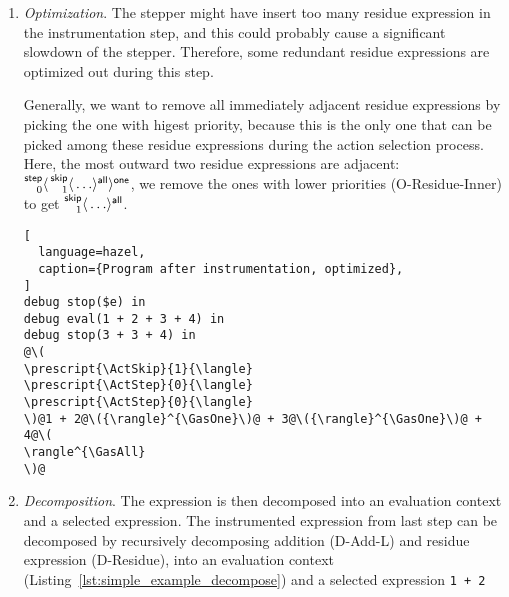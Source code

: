 \begin{enumerate}
  \begin{lstlisting}[language=hazel,caption={Program after instrumentation},label={lst:simple_example_instrument}]
debug stop($e) in
debug eval(1 + 2 + 3 + 4) in
debug stop(3 + 3 + 4) in
@\(
\prescript{\ActStep}{0}{\langle}
\prescript{\ActSkip}{1}{\langle}
\prescript{\ActStep}{0}{\langle}
\prescript{\ActStep}{0}{\langle}
\)@1 + 2@\({\rangle}^{\GasOne}\)@ + 3@\({\rangle}^{\GasOne}\)@ + 4@\(\rangle^{\GasAll}
\rangle^{\GasOne}\)@\end{lstlisting}

  However, during the instrumenting of the second filter, there is no
  sub-expression that matches the pattern
  \lstinline[language=hazel]{3 + 3 + 4}, so no residue expression is
  inserted around the sub-expression (I-Add-N). The instrumented
  expression remains the same.

\item \emph{Optimization}. The stepper might have insert too many
  residue expression in the instrumentation step, and this could
  probably cause a significant slowdown of the stepper. Therefore,
  some redundant residue expressions are optimized out during this
  step.

  Generally, we want to remove all immediately adjacent residue
  expressions by picking the one with higest priority, because this is
  the only one that can be picked among these residue expressions
  during the action selection process. Here, the most outward two
  residue expressions are adjacent:
  \(\prescript{\mathsf{step}}{0}{\langle} \prescript{\mathsf{skip}}{1}{\langle} \ldots \rangle^{\mathsf{all}} \rangle^{\mathsf{one}}\),
  we remove the ones with lower priorities (O-Residue-Inner) to get
  \(\prescript{\mathsf{skip}}{1}{\langle} \ldots \rangle^{\mathsf{all}}\).

\begin{lstlisting}[
  language=hazel,
  caption={Program after instrumentation, optimized},
]
debug stop($e) in
debug eval(1 + 2 + 3 + 4) in
debug stop(3 + 3 + 4) in
@\(
\prescript{\ActSkip}{1}{\langle}
\prescript{\ActStep}{0}{\langle}
\prescript{\ActStep}{0}{\langle}
\)@1 + 2@\({\rangle}^{\GasOne}\)@ + 3@\({\rangle}^{\GasOne}\)@ + 4@\(
\rangle^{\GasAll}
\)@\end{lstlisting}

\item \emph{Decomposition}. \label{num:simple_example_decompose} The
  expression is then decomposed into an evaluation context and a
  selected expression. The instrumented expression from last step can
  be decomposed by recursively decomposing addition (D-Add-L) and
  residue expression (D-Residue), into an evaluation context
  (Listing~\ref{lst:simple_example_decompose}) and a selected
  expression \lstinline{1 + 2}


\end{enumerate}
